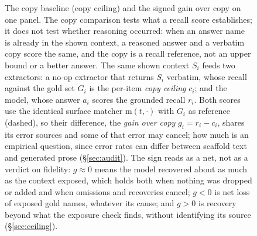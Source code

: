 \begin{figure}[t]
{}
\caption{The copy baseline (copy ceiling) and the signed gain over copy on one panel. The copy
comparison tests what a recall score establishes; it does not test whether reasoning occurred: when an
answer name is already in the shown context, a reasoned answer and a verbatim copy score the same, and
the copy is a recall reference, not an upper bound or a better answer. The same shown context $S_i$ feeds
two extractors: a no-op extractor that returns $S_i$ verbatim, whose recall against the gold set $G_i$
is the per-item \emph{copy ceiling} $c_i$; and the model, whose answer $a_i$ scores the grounded recall
$r_i$. Both scores use the identical surface matcher $\mathrm{m}(t,\cdot)$ with $G_i$ as reference
(dashed), so their difference, the \emph{gain over copy} $g_i=r_i-c_i$, shares its error sources and
some of that error may cancel; how much is an empirical question, since error rates can differ between
scaffold text and generated prose (\S\ref{sec:audit}). The sign reads as a net, not as a verdict on
fidelity: $g\approx0$ means the model recovered about as much as the context exposed, which holds both
when nothing was dropped or added and when omissions and recoveries cancel; $g<0$ is net loss of
exposed gold names, whatever its cause; and $g>0$ is recovery beyond what the exposure check finds, without identifying its
source (\S\ref{sec:ceiling}).}
\label{fig:ceiling}
\end{figure}
